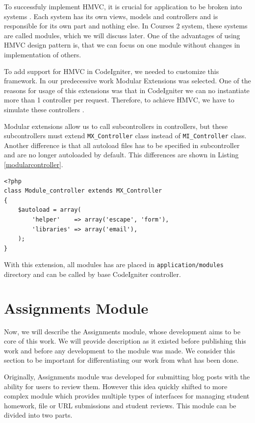 To successfuly implement HMVC, it is crucial for application to be broken into systems \cite{hmvc}. Each system has its own views, models and controllers and is responsible for its own part and nothing else. In Courses 2 system, these systems are called modules, which we will discuss later. One of the advantages of using HMVC design pattern is, that we can focus on one module without changes in implementation of others.

To add support for HMVC in CodeIgniter, we needed to customize this framework. In our predecessive work Modular Extensions \cite{modularextensions} was selected. One of the reasons for usage of this extensions was that in CodeIgniter we can no instantiate more than 1 controller per request. Therefore, to achieve HMVC, we have to simulate these controllers \cite{modularextensions}. 

Modular extensions allow us to call subcontrollers in controllers, but these subcontrollers must extend \texttt{MX\_Controller} class instead of \texttt{MI\_Controller} class. Another difference is that all autoload files has to  be specified in subcontroller and are no longer autoloaded by default. This differences are shown in Listing \ref{modularcontroller}.

\begin{lstlisting}[label={modularcontroller}, caption={Module controller}]
<?php     
class Module_controller extends MX_Controller 
{
    $autoload = array(
        'helper'    => array('escape', 'form'),
        'libraries' => array('email'),
    );
}
\end{lstlisting}


With this extension, all modules has are placed in \texttt{application/modules} directory and can be called by base CodeIgniter controller.

\section{Assignments Module}

Now, we will describe the Assignments module, whose development aims to be core of this work. We will provide description as it existed before publishing this work and before any development to the module was made. We consider this section to be important for differentiating our work from what has been done.

Originally, Assignments module was developed for submitting blog posts with the ability for users to review them. However  this idea quickly shifted to more complex module which provides multiple types of interfaces for managing student homework, file or URL submissions and student reviews. This module can be divided into two parts.

